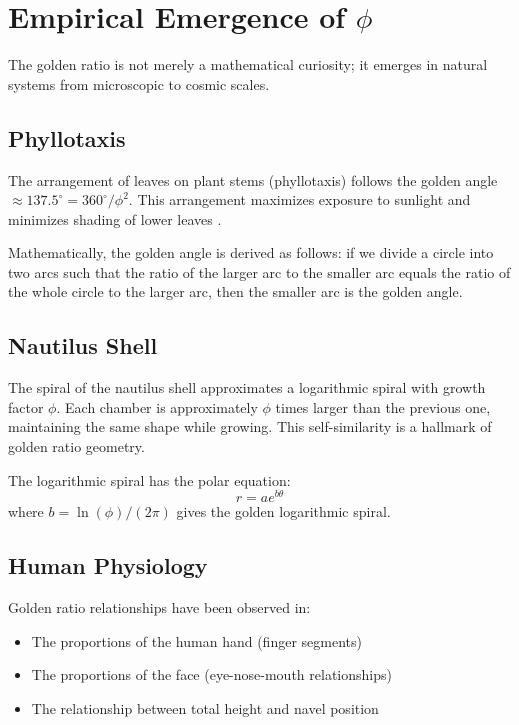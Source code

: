 \section{Empirical Emergence of $\phi$}

The golden ratio is not merely a mathematical curiosity; it emerges in natural systems from microscopic to cosmic scales.

\subsection{Phyllotaxis}

The arrangement of leaves on plant stems (phyllotaxis) follows the golden angle $\approx 137.5^\circ = 360^\circ/\phi^2$. This arrangement maximizes exposure to sunlight and minimizes shading of lower leaves \cite{livio_phi}.

Mathematically, the golden angle is derived as follows: if we divide a circle into two arcs such that the ratio of the larger arc to the smaller arc equals the ratio of the whole circle to the larger arc, then the smaller arc is the golden angle.

\subsection{Nautilus Shell}

The spiral of the nautilus shell approximates a logarithmic spiral with growth factor $\phi$. Each chamber is approximately $\phi$ times larger than the previous one, maintaining the same shape while growing. This self-similarity is a hallmark of golden ratio geometry.

The logarithmic spiral has the polar equation:
\[
r = a e^{b\theta}
\]
where $b = \ln(\phi)/(2\pi)$ gives the golden logarithmic spiral.

\subsection{Human Physiology}

Golden ratio relationships have been observed in:
\begin{itemize}
    \item The proportions of the human hand (finger segments)
    \item The proportions of the face (eye-nose-mouth relationships)
    \item The relationship between total height and navel position
\end{itemize}

